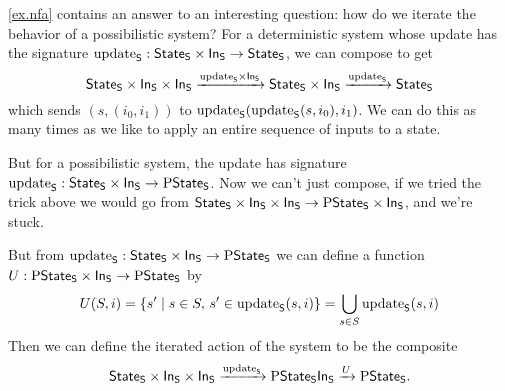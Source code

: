 \documentclass[DynamicalBook]{subfiles}
\begin{document}
\cref{ex.nfa} contains an answer to an interesting question: how do we iterate
the behavior of a possibilistic system? For a deterministic system whose update
has the signature $\update{S} : \State{S} \times \In{S} \to \State{S}$, we can
compose to get
$$\State{S} \times \In{S} \times \In{S} \xto{\update{S} \times \In{S}} \State{S}
\times \In{S} \xto{\update{S}} \State{S}$$
which sends $(s, (i_0, i_1))$ to $\update{S}(\update{S}(s, i_0), i_1)$. We can
do this as many times as we like to apply an entire sequence of inputs to a
state.

But for a possibilistic system, the update has signature $\update{S} :
\State{S} \times \In{S} \to \powset \State{S}$. Now we can't just compose, if we
tried the trick above we would go from $\State{S} \times \In{S} \times \In{S}
\to \powset\State{S} \times \In{S}$, and we're stuck.

But from $\update{S} : \State{S} \times \In{S} \to \powset\State{S}$ we can
define a function $U : \powset \State{S} \times \In{S} \to
\powset\State{S}$ by
\[
U(S, i) = \{s' \mid s \in S,\, s' \in \update{S}(s, i)\} =
\bigcup_{s \in S} \update{S}(s, i)
\]
Then we can define the iterated action of the system to be the composite
$$\State{S} \times \In{S} \times \In{S} \xto{\update{S}} \powset \State{S}
\In{S} \xto{U} \powset \State{S}.$$
\end{document}
